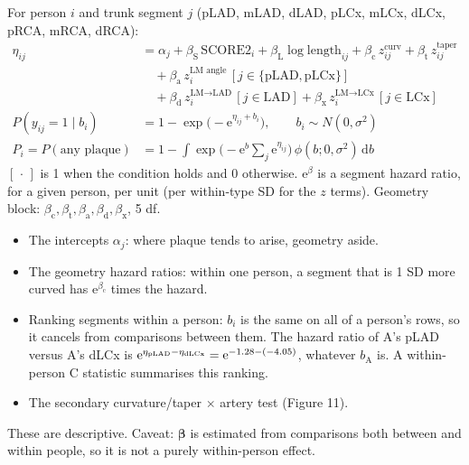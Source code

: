 \documentclass[11pt,a4paper]{article}
\newcommand{\e}{\mathrm{e}}
\begin{document}
\begin{tcolorbox}[colback=white,colframe=black!60,title=The model]
For person $i$ and trunk segment $j$ (pLAD, mLAD, dLAD, pLCx, mLCx, dLCx, pRCA, mRCA, dRCA):
\begin{align*}
\eta_{ij} &= \alpha_j + \beta_\text{S}\,\text{SCORE2}_i + \beta_\text{L}\log\text{length}_{ij}
  + \beta_\text{c}\,z^\text{curv}_{ij} + \beta_\text{t}\,z^\text{taper}_{ij}\\
 &\quad + \beta_\text{a}\,z^\text{LM angle}_i\,[j\in\{\text{pLAD},\text{pLCx}\}]\\
 &\quad + \beta_\text{d}\,z^\text{LM$\to$LAD}_i\,[j\in\text{LAD}] + \beta_\text{x}\,z^\text{LM$\to$LCx}_i\,[j\in\text{LCx}]\\[3pt]
P(y_{ij}=1\mid b_i) &= 1-\exp\!\big(-\e^{\eta_{ij}+b_i}\big),\qquad b_i\sim N(0,\sigma^2)\\[3pt]
P_i = P(\text{any plaque}) &= 1-\int\exp\!\Big(-\e^{b}\textstyle\sum_j \e^{\eta_{ij}}\Big)\,\phi(b;0,\sigma^2)\,\mathrm{d}b
\end{align*}
$[\,\cdot\,]$ is 1 when the condition holds and 0 otherwise. $\e^{\beta}$ is a segment hazard ratio, for a given person,
per unit (per within-type SD for the $z$ terms). Geometry block: $\beta_\text{c},\beta_\text{t},\beta_\text{a},\beta_\text{d},
\beta_\text{x}$, 5 df.
\end{tcolorbox}

\begin{tcolorbox}[colback=cIdea!5,colframe=cIdea,title=What ``where'' can be read from this model]
\begin{itemize}
\item The intercepts $\alpha_j$: where plaque tends to arise, geometry aside.
\item The geometry hazard ratios: within one person, a segment that is 1 SD more curved has $\e^{\beta_\text{c}}$ times the hazard.
\item Ranking segments within a person: $b_i$ is the same on all of a person's rows, so it cancels from comparisons
between them. The hazard ratio of A's pLAD versus A's dLCx is $\e^{\eta_\text{pLAD}-\eta_\text{dLCx}} =
\e^{\netaApLAD-(\netaAdLCx)}$, whatever $b_\text{A}$ is. A within-person C statistic summarises this ranking.
\item The secondary curvature/taper $\times$ artery test (Figure 11).
\end{itemize}
These are descriptive. Caveat: $\bm\beta$ is estimated from comparisons both between and within people, so it is not a
purely within-person effect.
\end{tcolorbox}
\end{document}
